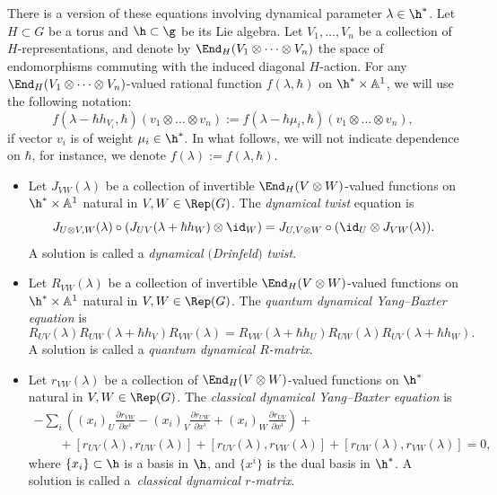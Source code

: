 	There is a version of these equations involving dynamical parameter $\lambda \in \h^*$. Let $H \subset G$ be a torus and $\h \subset \g$ be its Lie algebra. Let $V_1,\dots,V_n$ be a collection of $H$-representations, and denote by $\End_{H}(V_1 \otimes \dots \otimes V_n)$ the space of endomorphisms commuting with the induced diagonal $H$-action. For any $\End_{H}(V_1 \otimes \dots \otimes V_n)$-valued rational function $f(\lambda,\hbar)$ on $\h^*\times \mathbb{A}^1$, we will use the following notation:
	\[
	f(\lambda-\hbar h_{V_i},\hbar) (v_1 \otimes \dots \otimes v_n) := f(\lambda - \hbar \mu_i,\hbar) (v_1\otimes \dots \otimes v_n),
	\]
	if vector $v_i$ is of weight $\mu_i \in \h^*$. In what follows, we will not indicate dependence on $\hbar$, for instance, we denote $f(\lambda):=f(\lambda,\hbar)$.
	
	\begin{Definition}\qquad
		\label{def::all_dynamical}
		\begin{itemize}\itemsep=0pt
			\item Let $J_{VW}(\lambda)$ be a collection of invertible $\End_{H}(V \otimes W)$-valued functions on $\h^*\times \mathbb{A}^1$ natural in $V,W\in \Rep(G)$. The \emph{dynamical twist} equation is
			\begin{equation}
				\label{eq::dyn_twist}
				J_{U \otimes V,W}(\lambda) \circ (J_{UV}(\lambda+\hbar h_W) \otimes \id_W) = J_{U,V\otimes W} \circ (\id_U \otimes J_{VW}(\lambda)).
			\end{equation}
			A solution is called a \emph{dynamical $($Drinfeld$)$ twist}.
			\item Let $R_{VW}(\lambda)$ be a collection of invertible $\End_{H}(V \otimes W)$-valued functions on $\h^*\times \mathbb{A}^1$ natural in $V,W\in \Rep(G)$. The \emph{quantum dynamical Yang--Baxter equation} is
			\begin{equation}
				\label{eq::qdybe}
				R_{UV}(\lambda) R_{UW} (\lambda + \hbar h_V) R_{VW}(\lambda) = R_{VW}(\lambda+\hbar h_U) R_{UW}(\lambda) R_{UV}(\lambda + \hbar h_W).
			\end{equation}
			A solution is called a \emph{quantum dynamical $R$-matrix}.
			\item Let $r_{VW}(\lambda)$ be a collection of $\End_{H}(V \otimes W)$-valued functions on $\h^*$ natural in $V,W\in \Rep(G)$. The \emph{classical dynamical Yang--Baxter equation} is
			\begin{gather}
					-\sum\limits_i \left( (x_i)_{U} \frac{\partial r_{VW}}{\partial x^i} - (x_i)_V \frac{\partial r_{UW}}{\partial x^i} + (x_i)_W \frac{\partial r_{UV}}{\partial x^i}\right) +\nonumber \\
					\qquad{}+[r_{UV}(\lambda),r_{UW}(\lambda)] + [r_{UV}(\lambda),r_{VW}(\lambda)] + [r_{UW}(\lambda), r_{VW}(\lambda)] = 0,\label{eq::cdybe}
			\end{gather}
			where $\{x_i\} \subset \h$ is a basis in $\h$, and $\bigl\{x^i\bigr\}$ is the dual basis in $\h^*$. A solution is called a~\emph{classical dynamical $r$-matrix}.
		\end{itemize}
	\end{Definition}
	
